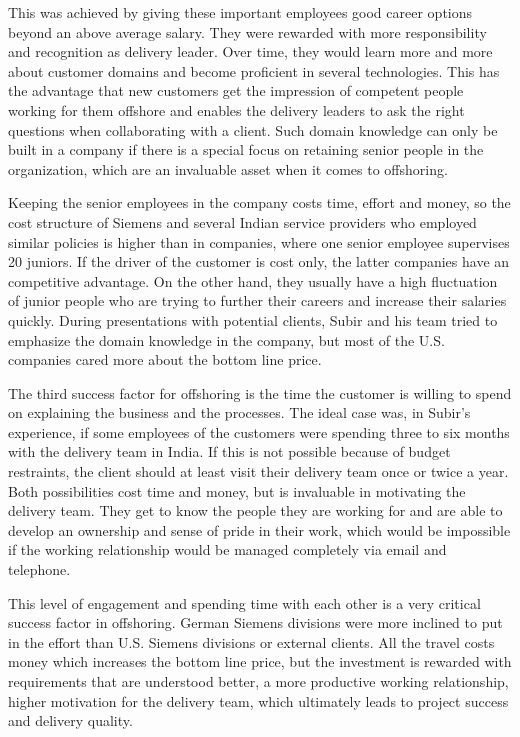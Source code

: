 This was achieved by giving these important employees good career options beyond an above average salary. They were rewarded with more responsibility and recognition as delivery leader. Over time, they would learn more and more about customer domains and become proficient in several technologies. This has the advantage that new customers get the impression of competent people working for them offshore and enables the delivery leaders to ask the right questions when collaborating with a client. Such domain knowledge can only be built in a company if there is a special focus on retaining senior people in the organization, which are an invaluable asset when it comes to offshoring.

Keeping the senior employees in the company costs time, effort and money, so the cost structure of Siemens and several Indian service providers who employed similar policies is higher than in companies, where one senior employee supervises 20 juniors. If the driver of the customer is cost only, the latter companies have an competitive advantage. On the other hand, they usually have a high fluctuation of junior people who are trying to further their careers and increase their salaries quickly. During presentations with potential clients, Subir and his team tried to emphasize the domain knowledge in the company, but most of the U.S. companies cared more about the bottom line price.

The third success factor for offshoring is the time the customer is willing to spend on explaining the business and the processes. The ideal case was, in Subir's experience, if some employees of the customers were spending three to six months with the delivery team in India. If this is not possible because of budget restraints, the client should at least visit their delivery team once or twice a year. Both possibilities cost time and money, but is invaluable in motivating the delivery team. They get to know the people they are working for and are able to develop an ownership and sense of pride in their work, which would be impossible if the working relationship would be managed completely via email and telephone.

This level of engagement and spending time with each other is a very critical success factor in offshoring. German Siemens divisions were more inclined to put in the effort than U.S. Siemens divisions or external clients. All the travel costs money which increases the bottom line price, but the investment is rewarded with requirements that are understood better, a more productive working relationship, higher motivation for the delivery team, which ultimately leads to project success and delivery quality.

